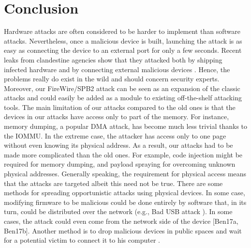 

\section{Conclusion}

Hardware attacks are often considered to be harder to implement than software attacks. Nevertheless, once a malicious device is built, launching the attack is as easy as connecting the device to an external port for only a few seconds. Recent leaks from clandestine agencies show that they attacked both by shipping infected hardware \cite{Gal14} and by connecting external malicious devices \cite{Fin14}. Hence, the problems really do exist in the wild and should concern security experts. Moreover, our FireWire/SPB2 attack can be seen as an expansion of the classic attacks and could easily be added as a module to existing off-the-shelf attacking tools.
The main limitation of our attacks compared to the old ones is that the devices in our attacks have access only to part of the memory. For instance, memory dumping, a popular DMA attack, has become much less trivial thanks to the IOMMU. In the extreme case, the attacker has access only to one page without even knowing its physical address. As a result, our attacks had to be made more complicated than the old ones. For example, code injection might be required for memory dumping, and payload spraying for overcoming unknown physical addresses.
Generally speaking, the requirement for physical access means that the attacks are targeted albeit this need not be true. There are some methods for spreading opportunistic attacks using physical devices. In some case, modifying firmware to be malicious could be done entirely by software that, in its turn, could be distributed over the network (e.g., Bad USB attack \cite{NL14}). In some cases, the attack could even come from the network side of the device [Ben17a, Ben17b]. Another method is to drop malicious devices in public spaces and wait for a potential victim to connect it to his computer \cite{TDF16}.

